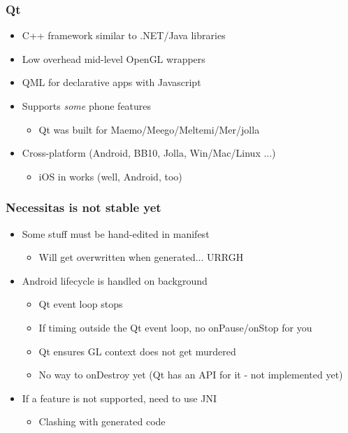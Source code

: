 \documentclass[ignorenonframetext]{beamer}
\begin{document}
\begin{frame}[fragile]
\frametitle{Qt}

\begin{itemize}

\item C++ framework similar to .NET/Java libraries

\item Low overhead mid-level OpenGL wrappers

\item QML for declarative apps with Javascript

\item Supports \emph{some} phone features
\begin{itemize}

\item Qt was built for Maemo/Meego/Meltemi/Mer/jolla
\end{itemize}

\item Cross-platform (Android, BB10, Jolla, Win/Mac/Linux ...)
\begin{itemize}

\item iOS in works (well, Android, too)
\end{itemize}
\end{itemize}
\end{frame}

\begin{frame}[fragile]
\frametitle{Necessitas is not stable yet}

\begin{itemize}

\item Some stuff must be hand-edited in manifest
\begin{itemize}

\item Will get overwritten when generated... URRGH
\end{itemize}

\item Android lifecycle is handled on background
\begin{itemize}

\item Qt event loop stops

\item If timing outside the Qt event loop, no onPause/onStop for you

\item Qt ensures GL context does not get murdered

\item No way to onDestroy yet (Qt has an API for it - not implemented yet)
\end{itemize}

\item If a feature is not supported, need to use JNI
\begin{itemize}

\item Clashing with generated code
\end{itemize}
\end{itemize}
\end{frame}
\end{document}
